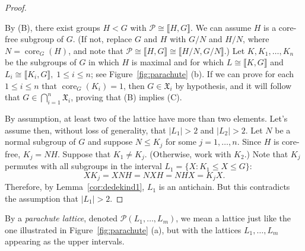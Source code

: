 \documentclass{gen-j-l}
\newcommand{\lb}{\ensuremath{\llbracket}}
\newcommand{\rb}{\ensuremath{\rrbracket}}
\newcommand{\<}{\ensuremath{\langle}}
\renewcommand{\>}{\ensuremath{\rangle}}
\theoremstyle{plain}
\theoremstyle{definition}
\theoremstyle{remark}
\numberwithin{theorem}{section}
\numberwithin{claim}{section}
\numberwithin{equation}{section}
\numberwithin{conjecture}{section}
\renewcommand{\leq}{\ensuremath{\leqslant}}
\newcommand{\core}{\ensuremath{\operatorname{core}}}
\newcommand{\2}{\ensuremath{\mathbf{2}}}
\newcommand{\3}{\ensuremath{\mathbf{3}}}
\newcommand{\sG}{\ensuremath{\mathfrak{X}}}
\newcommand{\sP}{\ensuremath{\mathscr{P}}}
\begin{document}
\begin{proof}
\begin{figure}[centering]
\begin{center}
{
}
\end{center}
\end{figure}
By (B), there exist groups $H <G$ with $\sP \cong \lb H,G \rb$.  We can assume $H$
is a core-free subgroup of $G$.  (If not, replace $G$ and $H$ with
$G/N$ and $H/N$, where $N=\core_G(H)$, and note that 
$\sP \cong \lb H,G \rb \cong \lb H/N,G/N \rb$.)
Let $K, K_1, \dots, K_n$ be the subgroups of $G$ in which $H$ is maximal
and for which
$L \cong \lb K, G \rb$ and $L_i \cong \lb K_i, G \rb,\; 1\leq i\leq n$; see
Figure~\ref{fig:parachute} (b). 
If we can prove for each $1\leq i\leq n$ that $\core_G(K_i)=1$, then $G\in
\sG_i$ by hypothesis, and it will follow that $G \in \bigcap\limits_{i=1}^n
\sG_i$, proving that (B) implies (C). 

By assumption, at least two of the lattice have more than two elements.  Let's
assume then, without loss of generality, that $|L_1| > 2$  and $|L_2| > 2$.
Let $N$ be a normal subgroup of $G$ and suppose $N\leq K_j$ for some $j = 1,
\dots, n$.  Since $H$ is core-free, $K_j = NH$.  
Suppose that $K_1 \neq K_j$. (Otherwise, work with $K_2$.)
Note that $K_j$ permutes with all subgroups in the interval 
$L_1 = \{X : K_1\leq X \leq G\}$:
\[
X K_j = X NH = NX H = NHX = K_j X.
\]
Therefore, by Lemma~\ref{cor:dedekind1}, 
$L_1$ is an antichain.  But this contradicts the assumption that $|L_1|>2$.
\end{proof}

By a \emph{parachute lattice}, denoted $\sP(L_1, \dots, L_m)$,
we mean a lattice just like the one illustrated in 
Figure~\ref{fig:parachute} (a), but with the lattices $L_1, \dots, L_m$
appearing as the upper intervals. %
\end{document}
